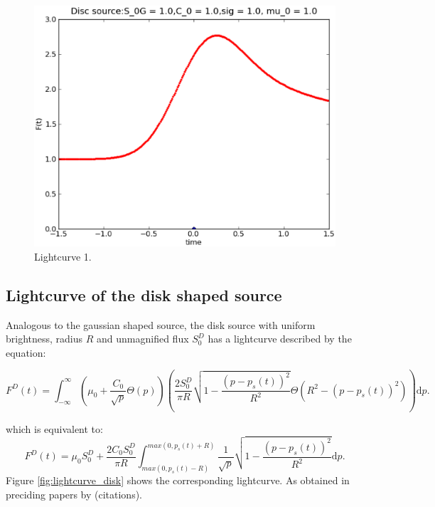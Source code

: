 \begin{figure}
\includegraphics[width = .8\textwidth]{plots/lightcurve_gaussian_1.eps}
\caption{\label{fig:lightcurve_gauss} Lightcurve 1.}
\end{figure}


\subsection{Lightcurve of the disk shaped source}

Analogous to the gaussian shaped source, the disk source with uniform brightness, radius $R$ and unmagnified flux $S_0^D$ has a lightcurve described by the equation:

\begin{equation}
 F^D(t) = \int_{-\infty}^\infty  \left( \mu_0 + \frac{C_0}{\sqrt{p}} \Theta \left( p \right) \right) \left( \frac{2 S_0^D}{ \pi R} \sqrt{1 - \frac{\left( p-p_s(t) \right)^2}{R^2}} \Theta \left(R^2 - \left(p-p_s(t) \right)^2 \right) \right) \mathrm{d}p.
\end{equation}

which is equivalent to:
\begin{equation}
 F^D(t) = \mu_0 S_0^D + \frac{2 C_0 S_0^D}{\pi R} \int_{max(0, p_s(t) - R)}^{max(0, p_s(t) + R)} \frac{1}{\sqrt{p}} \sqrt{1 - \frac{\left( p-p_s(t) \right)^2}{R^2}} \mathrm{d}p.
\end{equation}
Figure \ref{fig:lightcurve_disk} shows the corresponding lightcurve. As obtained in preciding papers by (citations).\\

